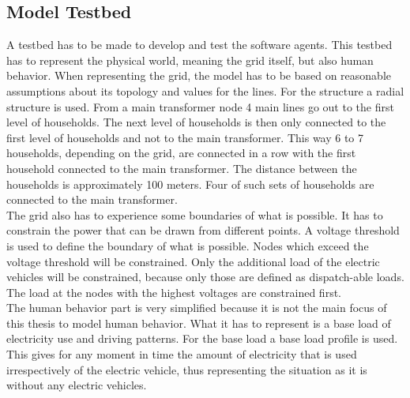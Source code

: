 \documentclass[a4paper]{article}
\begin{document}
\subsection{Model Testbed}
A testbed has to be made to develop and test the software agents. This testbed has to represent the physical world,
meaning the 
grid itself, but also human behavior. When representing the grid, the model has to be based on reasonable
assumptions 
about its topology and values for the lines. For the structure a radial structure is used. From a main transformer node 
4 main lines go out to the first level of households. The next level of households is then only connected to the 
first level of households and not to the main transformer. This way 6 to 7 households, depending on the grid, 
are connected in a row with the 
first household connected to the main transformer. The distance between the households is approximately 100 meters.
Four of such sets of households are connected to the main transformer. \\
The grid also has to experience some boundaries of what is possible. 
It has to constrain the power
that can be drawn from different points. A voltage threshold is used to define the boundary of what is possible. 
Nodes which exceed the voltage threshold will be constrained.
Only the additional load of the electric vehicles will be constrained, because 
only those are defined as dispatch-able loads. The load at the nodes with the highest voltages are constrained first.\\
The human behavior part is very simplified because it is not the main focus of this thesis to model 
human behavior. What it has to 
represent is a base load of electricity use and driving patterns. 
For the base load a base load profile is used. This gives for any moment in time the amount of electricity that is used 
irrespectively of the electric vehicle, thus representing the situation as it is without any electric vehicles. \\
\end{document}

